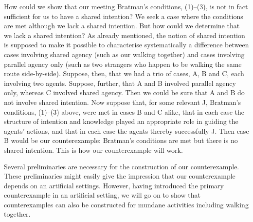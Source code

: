 \documentclass[12pt,\papersize]{extarticle}
\begin{document}
How could we show that our meeting Bratman's conditions, (1)--(3), is not in fact sufficient for us to have a shared intention? 
We seek a case where the conditions are met although we lack a shared intention.
But how could we determine that we lack a shared intention?
As already mentioned, the notion of shared intention is supposed to 
	make it possible to 
	characterise systematically a difference between 
		cases involving shared agency (such as our walking together)
		and
		cases involving parallel agency only (such as two strangers who happen to be walking the same route side-by-side). 
Suppose, then, that we had a trio of cases, A, B and C, each involving two agents.
Suppose, further, that A and B involved parallel agency only, whereas C involved shared agency.
Then we could be sure that A and B do not involve shared intention.
Now suppose 
	that, for some relevant J, Bratman's conditions, (1)--(3) above, were met in cases B and C alike, 
	that in each case the structure of intention and knowledge played an appropriate role in guiding the agents' actions,
	and that in each case the agents thereby successfully J.
Then case B would be our counterexample:
Bratman's conditions are met but there is no shared intention.
This is how our counterexample will work.

Several preliminaries are necessary for the construction of our counterexample. 
These preliminaries might easily give the impression that our counterexample depends on an artificial settings. 
However, having introduced the primary counterexample in an artificial setting, we will  go on to show that counterexamples can also be constructed for mundane activities including walking together.
\end{document}
